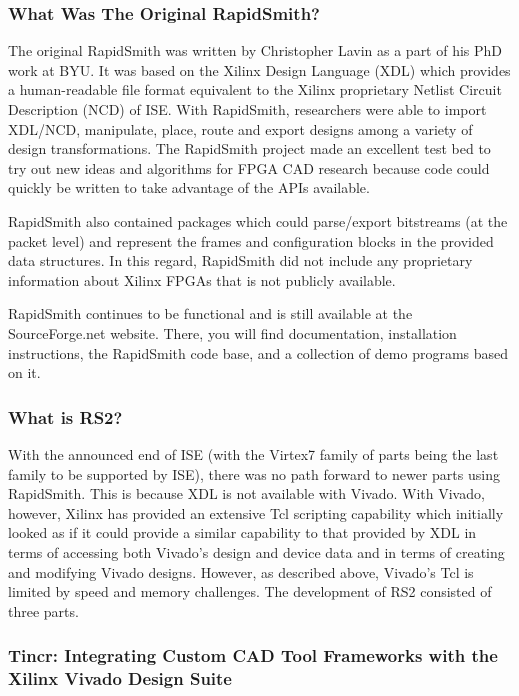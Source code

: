 \documentclass[10pt]{article}
\begin{document}
\subsubsection{What Was The Original RapidSmith?}
The original RapidSmith was written by Christopher Lavin as a part of his PhD
work at BYU.  It was based on the Xilinx Design Language (XDL) which provides a
human-readable file format equivalent to the Xilinx proprietary Netlist Circuit
Description (NCD) of ISE.  With RapidSmith, researchers were able to import
XDL/NCD, manipulate, place, route and export designs among a variety of design
transformations.  The RapidSmith project made an excellent test bed to try out
new ideas and algorithms for FPGA CAD research because code could quickly be
written to take advantage of the APIs available.

RapidSmith also contained packages which could parse/export bitstreams (at the
packet level) and represent the frames and configuration blocks in the provided
data structures.  In this regard, RapidSmith did not include any proprietary
information about Xilinx FPGAs that is not publicly available.

RapidSmith continues to be functional and is still available at the
SourceForge.net website.  There, you will find documentation, installation
instructions, the RapidSmith code base, and a collection of demo programs based
on it.

\subsubsection{What is RS2?}
With the announced end of ISE (with the Virtex7 family of parts being the last
family to be supported by ISE), there was no path forward to newer parts using
RapidSmith.  This is because XDL is not available with Vivado. With
Vivado, however, Xilinx has provided an extensive Tcl scripting capability which 
initially looked as if it could provide a similar capability to that provided by
XDL in terms of accessing both Vivado's design and device data and in terms of
creating and modifying Vivado designs.  However, as described above, Vivado's
Tcl is limited by speed and memory challenges.
The development of RS2 consisted of three parts.

\subsubsection{Tincr: Integrating Custom CAD Tool Frameworks with the Xilinx 
Vivado Design Suite} 
\end{document}

